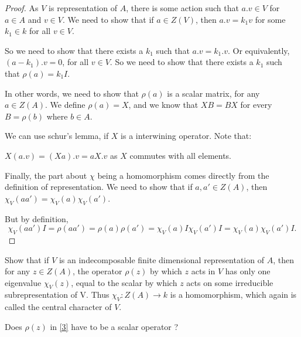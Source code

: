 \begin{proof}
As $V$ is representation of $A$, there is some action such that $a.v\in V$ for $a \in A$ and $v\in V$. We need to show that if $a \in Z(V)$, then $a.v = k_1 v$ for some $k_1 \in k$ for all $v\in V$. 

So we need to show that there exists a $k_1$ such that $a.v=k_1.v$. 
Or equivalently, $(a-k_1).v=0$, for all $v \in V$. 
So we need to show that there exists  a $k_1$ such that $\rho(a)=k_1I$.

In other words, we need to show that $\rho(a)$ is a scalar matrix, for any $a \in Z(A)$. 
We define $\rho(a)=X$, and we know that $XB=BX$ for every $B=\rho(b)$ where $b\in A$. 

We can use schur's lemma, if $X$ is a interwining operator. Note that:

$X(a.v)=(Xa).v=aX.v$ as $X$ commutes with all elements.

Finally, the part about $\chi$ being a homomorphism comes directly from the definition of representation.  We need to show that if $a,a'\in Z(A)$, then $\chi_V(aa') = \chi_V(a)\chi_V(a')$.

But by definition, $$\chi_V(aa')I = \rho(aa') = \rho(a)\rho(a') = \chi_V(a)I \chi_V(a')I = \chi_V(a)\chi_V(a')I. $$

\end{proof}

\begin{thm}
\label{3} Show that if \(V\) is an indecomposable finite dimensional representation of \(A\), then for any \(z\in Z(A)\), the operator \(\rho (z)\) by which \(z\) acts in \(V\) has only one eigenvalue \(\chi _{V} (z)\), equal to the scalar by which \(z\) acts on some irreducible subrepresentation of V. Thus \(\chi _{V} :Z(A)\rightarrow k\) is a homomorphism, which again is called the  central character of \(V\).
\end{thm}

\begin{thm}
Does \(\rho (z)\) in \ref{3} have to be a scalar operator ?
\end{thm}

